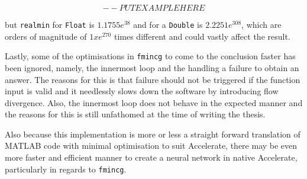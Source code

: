 $$-- PUT EXAMPLE HERE$$

but \texttt{realmin} for \texttt{Float} is $1.1755e^{38}$ and for a \texttt{Double} is $2.2251e^{308}$, which are orders of magnitude of $1xe^{270}$ times different and could vastly affect the result.

Lastly, some of the optimisations in \texttt{fmincg} to come to the conclusion faster has been ignored, namely, the innermost loop and the handling a failure to obtain an answer. The reasons for this is that failure should not be triggered if the function input is valid and it needlessly slows down the software by introducing flow divergence. Also, the innermost loop does not behave in the expected manner and the reasons for this is still unfathomed at the time of writing the thesis.

Also because this implementation is more or less a straight forward translation of MATLAB code with minimal optimisation to suit Accelerate, there may be even more faster and efficient manner to create a neural network in native Accelerate, particularly in regards to \texttt{fmincg}.

